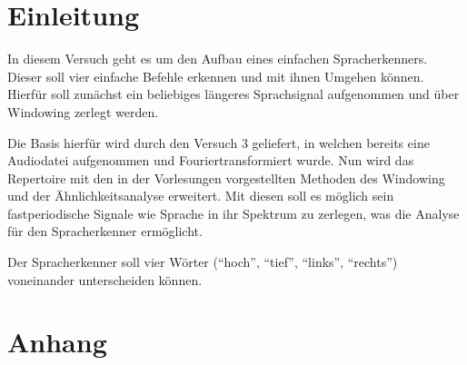 \documentclass[12pt, oneside, a4paper, \docLanguage]{report}
\begin{document}

\setcounter{section}{0}



\clearpage

%
%


%
%


%
%




\setcounter{page}{1}
\pagestyle{default}
%
%
\chapter*{Einleitung}
\label{chap:EINL}

In diesem Versuch geht es um den Aufbau eines einfachen Spracherkenners. Dieser soll vier einfache Befehle erkennen und mit ihnen Umgehen können.
Hierfür soll zunächst ein beliebiges längeres Sprachsignal aufgenommen und über Windowing zerlegt werden.

Die Basis hierfür wird durch den Versuch 3 geliefert, in welchen bereits eine Audiodatei aufgenommen und Fouriertransformiert wurde.
Nun wird das Repertoire mit den in der Vorlesungen vorgestellten Methoden des Windowing und der Ähnlichkeitsanalyse erweitert.
Mit diesen soll es möglich sein fastperiodische Signale wie Sprache in ihr Spektrum zu zerlegen, was die Analyse für den Spracherkenner ermöglicht.

Der Spracherkenner soll vier Wörter (“hoch”, “tief”, “links”, “rechts”) voneinander unterscheiden können.


%
%




%
%




%
%



%
%
\renewcommand\thesection{A.\arabic{section}}
\renewcommand\thesubsection{\thesection.\arabic{subsection}}

\chapter*{Anhang}
\label{chap:APPENDIX}
\addtocounter{chapter}{1}
\setcounter{section}{0}
\end{document}
